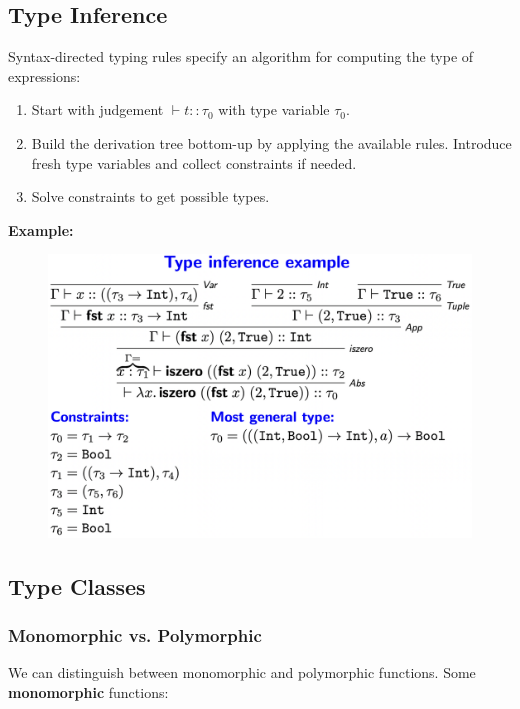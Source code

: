 \documentclass[a4paper]{extarticle}
\begin{document}
\subsection{Type Inference}

Syntax-directed typing rules specify an algorithm for computing the type of expressions:

\begin{enumerate}
    \item Start with judgement \(\vdash t :: \tau_0\) with type variable \(\tau_0\).
    \item Build the derivation tree bottom-up by applying the available rules. Introduce fresh type variables and collect constraints if needed.
    \item Solve constraints to get possible types.
\end{enumerate}

\begin{ebox}
    \textbf{Example:}

    \begin{figure}[H]
        \includegraphics[width=12cm]{../images/FMFP_Fig5-5}
        \centering
    \end{figure}
\end{ebox}

\subsection{Type Classes}

\subsubsection{Monomorphic vs. Polymorphic}

We can distinguish between monomorphic and polymorphic functions. Some \textbf{monomorphic} functions:
\end{document}
